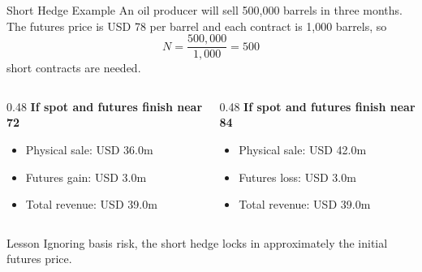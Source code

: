 \documentclass[aspectratio=169,11pt]{beamer}
\begin{document}
\begin{frame}{Short Hedge Example}
    \small
    An oil producer will sell 500,000 barrels in three months.
    The futures price is USD 78 per barrel and each contract is 1,000 barrels, so
    \[
        N=\frac{500{,}000}{1{,}000}=500
    \]
    short contracts are needed.

    \begin{columns}[T]
        \begin{column}{0.48\textwidth}
            \textbf{If spot and futures finish near 72}
            \begin{itemize}
                \item Physical sale: USD 36.0m
                \item Futures gain: USD 3.0m
                \item Total revenue: USD 39.0m
            \end{itemize}
        \end{column}
        \begin{column}{0.48\textwidth}
            \textbf{If spot and futures finish near 84}
            \begin{itemize}
                \item Physical sale: USD 42.0m
                \item Futures loss: USD 3.0m
                \item Total revenue: USD 39.0m
            \end{itemize}
        \end{column}
    \end{columns}

    \begin{block}{Lesson}
        Ignoring basis risk, the short hedge locks in approximately the initial futures price.
    \end{block}
\end{frame}
\end{document}
